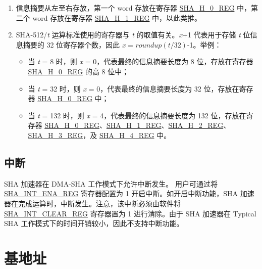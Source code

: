 \documentclass[main\_\_CN.tex]{subfiles}
\begin{document}
\begin{tiplisting}
\vspace{-2.5em}
\begin{enumerate}\label{note2}
\item 信息摘要从左至右存放，第一个 word 存放在寄存器 \hyperref[regdesc:SHAHNREG]{SHA\_H\_0\_REG} 中，第二个 word 存放在寄存器 \hyperref[regdesc:SHAHNREG]{SHA\_H\_1\_REG} 中，以此类推。
\item SHA-512/{\it{t}} 运算标准使用的寄存器与 {\it{t}} 的取值有关。{\it{x}}+1 代表用于存储 {\it{t}} 位信息摘要的 32 位寄存器个数，因此 {\it{x}} = \begin{math}roundup(t/32)\end{math}-1。举例：
\begin{itemize}
    \item 当 {\it{t}} = 8 时，则 {\it{x}} = 0，代表最终的信息摘要长度为 8 位，存放在寄存器 \hyperref[regdesc:SHAHNREG]{SHA\_H\_0\_REG} 的高 8 位中；
    \item 当 {\it{t}} = 32 时，则 {\it{x}} = 0，代表最终的信息摘要长度为 32 位，存放在寄存器 \hyperref[regdesc:SHAHNREG]{SHA\_H\_0\_REG} 中；
    \item 当 {\it{t}} = 132 时，则 {\it{x}} = 4，代表最终的信息摘要长度为 132 位，存放在寄存器 \hyperref[regdesc:SHAHNREG]{SHA\_H\_0\_REG}、\hyperref[regdesc:SHAHNREG]{SHA\_H\_1\_REG}、\hyperref[regdesc:SHAHNREG]{SHA\_H\_2\_REG}、\hyperref[regdesc:SHAHNREG]{SHA\_H\_3\_REG}，及 \hyperref[regdesc:SHAHNREG]{SHA\_H\_4\_REG} 中。
\end{itemize}
\end{enumerate}
\end{tiplisting}

\subsection{中断}\label{Interrupt}

SHA 加速器在 DMA-SHA 工作模式下允许中断发生。
 用户可通过将 \hyperref[regdesc:SHAINTENAREG]{SHA\_INT\_ENA\_REG} 寄存器配置为 1 开启中断。如开启中断功能，SHA 加速器在完成运算时，中断发生。注意，该中断必须由软件将 \hyperref[regdesc:SHAINTCLEARREG]{SHA\_INT\_CLEAR\_REG} 寄存器置为 1 进行清除。由于 SHA 加速器在 Typical SHA 工作模式下的时间开销较小，因此不支持中断功能。



\section{基地址} \label{Label SHA MODULE ENTRY}
\end{document}
